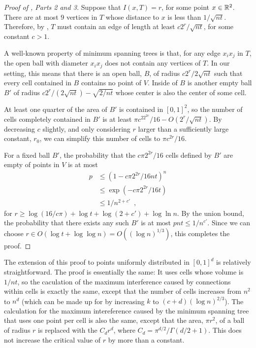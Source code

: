 \documentclass{patmorin}
\begin{document}
\begin{proof}[Proof of , Parts 2 and 3]
Suppose that $I(x,T)=r$, for some point $x\in\mathbb{R}^2$.  There are at most
9 vertices in $T$ whose distance to $x$ is less than $1/\sqrt{nt}$.
Therefore, by , $T$ must contain an edge of length at least
$c2^r/\sqrt{nt}$, for some constant $c>1$.  

A well-known property of minimum spanning trees is that, for any edge
$x_ix_j$ in $T$, the open ball with diameter $x_ix_j$ does not contain
any vertices of $T$.  In our setting, this means that there is an open
ball, $B$, of radius $c2^r/2\sqrt{nt}$ such that every cell contained in
$B$ contains no point of $V$.  Inside of $B$ is another empty ball $B'$
of radius $c2^r/(2\sqrt{nt})-\sqrt{2/nt}$ whose center is also the center
of some cell.

At least one quarter of the area of $B'$ is contained in $[0,1]^2$,
so the number of cells completely contained in $B'$ is at least $\pi c^22^{2r}/16 -
O(2^{r}/\sqrt{nt})$.  By decreasing $c$ slightly, and only considering
$r$ larger than a sufficiently large constant, $r_0$, we can simplify
this number of cells to $\pi c^{2r}/16$.

For a fixed ball $B'$, the probability that the $c\pi  2^{2r}/16$ cells
defined by $B'$ are empty of points in $V$ is at most
\begin{align*}
 p 
  & \le (1-c\pi 2^{2r}/{16nt})^{n} \\
  & \le \exp(-c\pi 2^{2r}/16t) \\
 & \le 1/n^{2+c'} \enspace ,
\end{align*}
for $r\ge\log(16/c\pi)+\log t + \log(2+c')+\log\ln n$.  By the union bound, the
probability that there exists any such $B'$ is at most
$pnt\le 1/n^{c'}$.  Since we can choose $r\in O(\log t+\log\log n) = O((\log
n)^{1/3})$, this completes the proof.
\end{proof}

The extension of this proof to points uniformly
distributed in $[0,1]^d$ is relatively straightforward.  The proof is
essentially the same: It uses cells whose volume is $1/nt$, so the
caculation of the maximum interference caused by connections within
cells is exactly the same, except that the number of cells increases
from $n^2$ to $n^{d}$ (which can be made up for by increasing $k$ to
$(c+d)(\log n)^{2/3}$).  The calculation for the maximum intereference
caused by the minimum spanning tree that uses one point per cell is
also the same, except that the area, $\pi r^2$, of a ball of radius $r$
is replaced with the $C_d r^d$, where $C_d = \pi^{d/2}/\Gamma(d/2+1)$.
This does not increase the critical value of $r$ by more than a constant.
\end{document}
